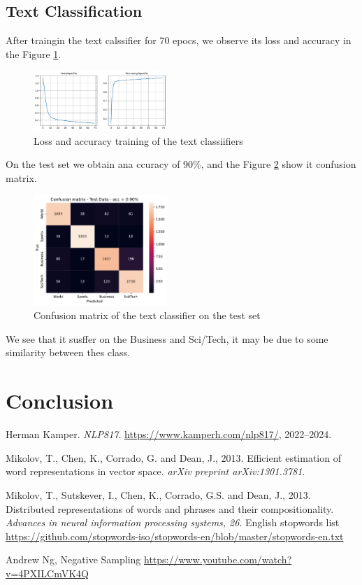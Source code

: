 \subsection{Text Classification}
After traingin the text calssifier for 70 epocs, we observe its loss and accuracy in the Figure \ref{fig:loss-acc}.
\begin{figure}[H]\centering
		\includegraphics[width=0.45\textwidth]{figures/class_loss.pdf}
	\caption{Loss and accuracy training of the text classiifiers}
	\label{fig:loss-acc}
\end{figure}
On the test set we obtain ana ccuracy of $90\%$, and the Figure \ref{fig:cmat} show it confusion matrix.
\begin{figure}[H]\centering
	\includegraphics[width=0.45\textwidth]{figures/conf_mat.pdf}
\caption{Confusion matrix of the text classifier on the test set}
\label{fig:cmat}
\end{figure}

We see that it susffer on the Business and Sci/Tech, it may be due to some similarity between thes class.
\section{Conclusion}

   \begin{thebibliography}{1}

	Herman Kamper. \emph{NLP817}. \href{https://www.kamperh.com/nlp817/}{https://www.kamperh.com/nlp817/}, 2022--2024.

	    Mikolov, T., Chen, K., Corrado, G. and Dean, J., 2013. Efficient estimation of word representations in vector space. \textit{arXiv preprint arXiv:1301.3781}.

	    Mikolov, T., Sutskever, I., Chen, K., Corrado, G.S. and Dean, J., 2013. Distributed representations of words and phrases and their compositionality. \textit{Advances in neural information processing systems, 26}.
	    English stopwords list \href{https://github.com/stopwords-iso/stopwords-en/blob/master/stopwords-en.txt}{https://github.com/stopwords-iso/stopwords-en/blob/master/stopwords-en.txt}

	    Andrew Ng, Negative Sampling \href{https://www.youtube.com/watch?v=4PXILCmVK4Q}{https://www.youtube.com/watch?v=4PXILCmVK4Q}
   \end{thebibliography}
